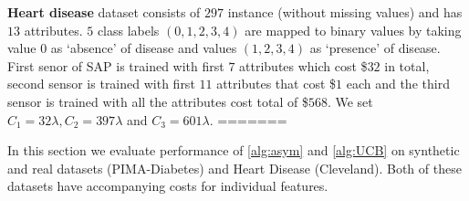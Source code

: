 {\bf Heart disease} dataset consists of $297$ instance (without missing values) and has $13$ attributes. $5$ class labels $(0,1,2,3,4)$ are mapped to binary values by taking value $0$ as `absence' of disease and values $(1,2,3,4)$ as `presence' of disease. First senor of SAP is trained with first $7$ attributes which cost  \$$32$ in total, second sensor is trained with first $11$ attributes that cost \$$1$ each and the third sensor is trained with all the attributes  cost total of \$$568$. We set $C_1= 32\lambda, C_2= 397\lambda$ and $C_3= 601\lambda$.
=======


In this section we evaluate performance of \ref{alg:asym} and \ref{alg:UCB} on synthetic and real datasets (PIMA-Diabetes) and Heart Disease (Cleveland). Both of these datasets have accompanying costs for individual features.%

